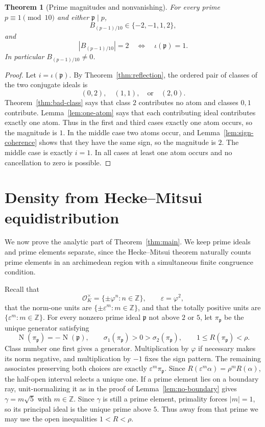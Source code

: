 \documentclass[12pt]{amsart}
\newtheorem{theorem}{Theorem}[section]
\theoremstyle{definition}
\theoremstyle{remark}
\DeclareMathOperator{\N}{N}
\newcommand{\ZZ}{\mathbb{Z}}
\newcommand{\OK}{\mathcal{O}_K}
\newcommand{\eps}{\varepsilon}
\newcommand{\ph}{\varphi}
\begin{document}
\begin{theorem}[Prime magnitudes and nonvanishing]
\label{thm:prime-classification}
For every prime $p\equiv1\pmod{10}$ and either
$\mathfrak p\mid p$,
\[
  B_{(p-1)/10}\in\{-2,-1,1,2\},
\]
and
\[
  \left|B_{(p-1)/10}\right|=2
  \quad\Longleftrightarrow\quad
  \iota(\mathfrak p)=1.
\]
In particular $B_{(p-1)/10}\neq0$.
\end{theorem}

\begin{proof}
Let $i=\iota(\mathfrak p)$.  By Theorem~\ref{thm:reflection}, the
ordered pair of classes of the two conjugate ideals is
\[
  (0,2),\quad(1,1),\quad\text{or}\quad(2,0).
\]
Theorem~\ref{thm:bad-class} says that class $2$ contributes no atom and
classes $0,1$ contribute.  Lemma~\ref{lem:one-atom} says that each
contributing ideal contributes exactly one atom.  Thus in the first
and third cases exactly one atom occurs, so the magnitude is $1$.  In
the middle case two atoms occur, and Lemma~\ref{lem:sign-coherence}
shows that they have the same sign, so the magnitude is $2$.  The
middle case is exactly $i=1$.  In all cases at least one atom occurs
and no cancellation to zero is possible.
\end{proof}

\section{Density from Hecke--Mitsui equidistribution}
\label{sec:density}

We now prove the analytic part of Theorem~\ref{thm:main}.  We keep
prime ideals and prime elements separate, since the Hecke--Mitsui
theorem naturally counts prime elements in an archimedean region with
a simultaneous finite congruence condition.

Recall that
\[
  \OK^\times=\{\pm\ph^n:n\in\ZZ\},
  \qquad \eps=\ph^2,
\]
that the norm-one units are $\{\pm\eps^m:m\in\ZZ\}$, and that the
totally positive units are $\{\eps^m:m\in\ZZ\}$.  For every nonzero
prime ideal $\mathfrak p$ not above $2$ or $5$, let
$\pi_{\mathfrak p}$ be the unique generator satisfying
\[
  \N(\pi_{\mathfrak p})=-\N(\mathfrak p),
  \qquad
  \sigma_1(\pi_{\mathfrak p})>0>
  \sigma_2(\pi_{\mathfrak p}),
  \qquad
  1\leq R(\pi_{\mathfrak p})<\rho.
\]
Class number one first gives a generator.  Multiplication by $\ph$ if
necessary makes its norm negative, and multiplication by $-1$ fixes
the sign pattern.  The remaining associates preserving both choices
are exactly $\eps^m\pi_{\mathfrak p}$.  Since
$R(\eps^m\alpha)=\rho^mR(\alpha)$, the half-open interval selects a
unique one.  If a prime element lies on a boundary ray, unit-normalizing
it as in the proof of Lemma~\ref{lem:no-boundary} gives
$\gamma=m\sqrt5$ with $m\in\ZZ$.  Since $\gamma$ is still a prime
element, primality forces $|m|=1$, so its principal ideal is the unique
prime above $5$.  Thus away from that prime we may use the open
inequalities $1<R<\rho$.
\end{document}
